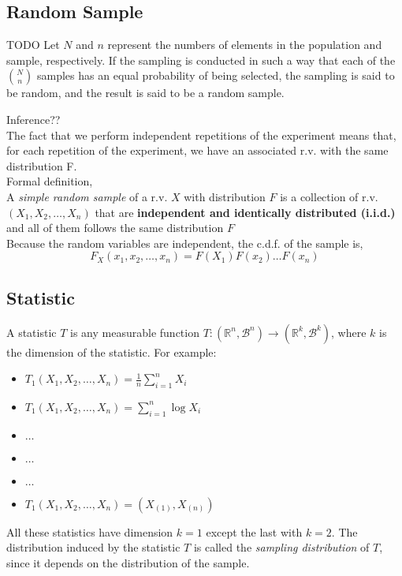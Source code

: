 \subsection{Random Sample}
TODO
Let $N$ and $n$ represent the numbers of elements in the population and sample,
respectively. If the sampling is conducted in such a way that each of the $\binom{N}{n}$
samples has an equal probability of being selected, the sampling is said to be
random, and the result is said to be a random sample.

Inference??\\

The fact that we perform independent repetitions of the experiment means that, for each repetition of the experiment, 
we have an associated r.v. with the same distribution F.\\

Formal definition,\\
A \textit{simple random sample} of a r.v. $X$ with distribution $F$ is a collection of r.v. $(X_1, X_2,\dots,X_n)$ that are 
\textbf{independent and identically distributed (i.i.d.)} and all of them follows the same distribution $F$\\

Because the random variables are independent, the c.d.f. of the sample is,
\[ F_X(x_1,x_2,\dots,x_n) = F(X_1)F(x_2)\dots F(x_n) \]

\subsection{Statistic}
A statistic $T$ is any measurable function $T: (\mathbb{R}^n,\mathcal{B}^n) \rightarrow (\mathbb{R}^k,\mathcal{B}^k)$, where $k$ 
is the dimension of the statistic. For example:
\begin{itemize}
    \item $T_1(X_1,X_2,\dots,X_n) = \frac{1}{n}\sum_{i=1}^{n}X_i$
    \item $T_1(X_1,X_2,\dots,X_n) = \sum_{i=1}^{n} \log{X_i}$
    \item $\dots$
    \item $\dots$
    \item $\dots$
    \item $T_1(X_1,X_2,\dots,X_n) = (X_{(1)}, X_{(n)})$
\end{itemize}
All these statistics have dimension $k=1$ except the last with $k=2$. The distribution induced by the statistic $T$ is called the 
\textit{sampling distribution} of $T$, since it depends on the distribution of the sample.

